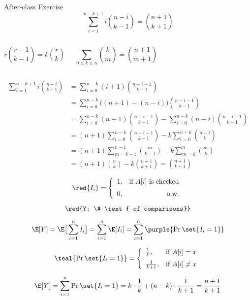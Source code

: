 \begin{frame}{}
  \begin{exampleblock}{After-class Exercise}
    \[
      \sum_{i=1}^{n-k+1} i \binom{n-i}{k-1} = \binom{n+1}{k+1}
    \]
  \end{exampleblock}

  \begin{columns}
      \[
	r \binom{r-1}{k-1} = k \binom{r}{k}
      \]

      \vspace{0.60cm}
      \[
	\sum_{0 \le k \le n} \binom{k}{m} = \binom{n+1}{m+1}
      \]
  \end{columns}
\end{frame}

\begin{frame}{}
  \begin{align*}
    \sum_{i=1}^{n-k+1} i \binom{n-i}{k-1} &= \sum_{i=0}^{n-k} (i+1) \binom{n-i-1}{k-1} \\
    &= \sum_{i=0}^{n-k} \big((n+1) - (n-i)\big) \binom{n-i-1}{k-1} \\
    &= \sum_{i=0}^{n-k} (n+1) \binom{n-i-1}{k-1} - \sum_{i=0}^{n-k} (n-i) \binom{n-i-1}{k-1} \\
    &= (n+1) \sum_{i=0}^{n-k}\binom{n-i-1}{k-1} - k \sum_{i=0}^{n-k} \binom{n-i}{k} \\
    &= (n+1) \sum_{m=k-1}^{n-1}\binom{m}{k-1} - k \sum_{m=k}^{n} \binom{m}{k} \\
    &= (n+1) \binom{n}{k} - k \binom{n+1}{k+1} = \binom{n+1}{k+1}
  \end{align*}
\end{frame}

\begin{frame}{}
  \centerline{}

  \pause
  \[
    \red{I_{i}} = \left\{\begin{array}{lr}
      1, & \text{if } A[i] \text{ is checked} \\[6pt]
      0, & \text{o.w.}
    \end{array}\right.
  \]

  \pause
  \[
    \red{Y: \# \text{ of comparisons}}
  \]

  \pause
  \[
    \E[Y] = \E\big[\sum_{i=1}^{n} I_{i}\big] = \sum_{i=1}^{n} \E[I_{i}] = \sum_{i=1}^{n} \purple{\Pr\set{I_{i} = 1}}
  \]

  \pause
  \[
    \teal{\Pr\set{I_{i} = 1}} = \left\{\begin{array}{lr}
      \frac{1}{k}, & \text{if } A[i] = x \\[6pt]
      \frac{1}{k+1}, & \text{if } A[i] \neq x
    \end{array}\right.
  \]

  \pause
  \[
    \E[Y] = \sum_{i=1}^{n} \Pr\set{I_{i} = 1} = k \cdot \frac{1}{k} + (n-k) \cdot \frac{1}{k+1} = \frac{n+1}{k+1}
  \]
\end{frame}

